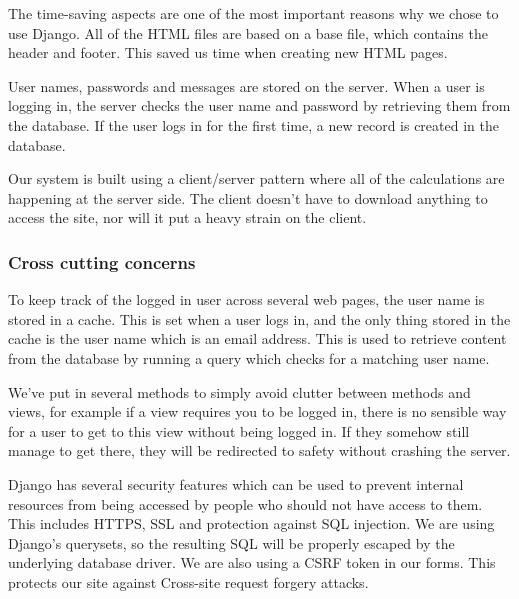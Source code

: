 The time-saving aspects are one of the most important reasons why we chose to use Django. All of the HTML files are based on a base file, which contains the header and footer. This saved us time when creating new HTML pages. 

User names, passwords and messages are stored on the server. When a user is logging in, the server checks the user name and password by retrieving them from the database. If the user logs in for the first time, a new record is created in the database. 

Our system is built using a client/server pattern where all of the calculations are happening at the server side. The client doesn't have to download anything to access the site, nor will it put a heavy strain on the client.

\subsubsection{Cross cutting concerns}
To keep track of the logged in user across several web pages, the user name is stored in a cache. This is set when a user logs in, and the only thing stored in the cache is the user name which is an email address. This is used to retrieve content from the database by running a query which checks for a matching user name.

We've put in several methods to simply avoid clutter between methods and views, for example if a view requires you to be logged in, there is no sensible way for a user to get to this view without being logged in. If they somehow still manage to get there, they will be redirected to safety without crashing the server.

Django has several security features which can be used to prevent internal resources from being accessed by people who should not have access to them. This includes HTTPS, SSL and protection against SQL injection. We are using Django’s querysets, so the resulting SQL will be properly escaped by the underlying database driver. We are also using a CSRF token in our forms. This protects our site against Cross-site request forgery attacks.
